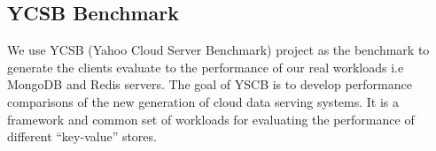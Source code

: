     \subsection{YCSB Benchmark}
	We use YCSB \cite{cooper2010benchmarking} (Yahoo Cloud Server Benchmark) project as the benchmark to generate the clients evaluate 
to the performance of our real workloads i.e MongoDB and Redis servers. The goal of YSCB is to develop performance comparisons of the new 
generation of cloud data serving systems. It is a framework and common set of workloads for evaluating the performance of different 
“key-value” stores.
	